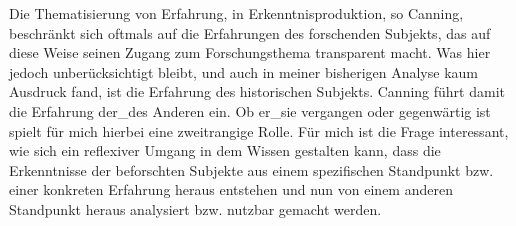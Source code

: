  Die Thematisierung von
Erfahrung, in Erkenntnisproduktion, so Canning, beschränkt sich oftmals auf
die Erfahrungen des forschenden Subjekts, das auf diese Weise seinen Zugang zum
Forschungsthema transparent macht. Was hier jedoch unberücksichtigt bleibt, und
auch in meiner bisherigen Analyse kaum Ausdruck fand, ist die Erfahrung des
historischen Subjekts. Canning führt damit die Erfahrung der\_des Anderen ein.
Ob er\_sie vergangen oder gegenwärtig ist spielt für mich hierbei eine zweitrangige
Rolle. Für mich ist die Frage interessant, wie sich ein reflexiver Umgang in
dem Wissen gestalten kann, dass die Erkenntnisse der beforschten Subjekte aus
einem spezifischen Standpunkt bzw. einer konkreten Erfahrung heraus entstehen
und nun von einem anderen Standpunkt heraus analysiert bzw. nutzbar gemacht
werden.\\

